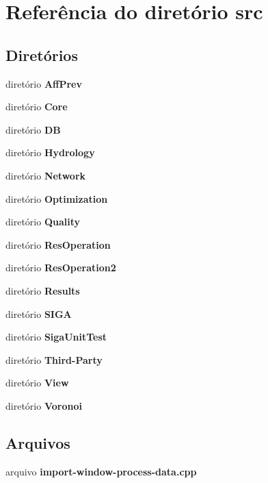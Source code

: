 \section{Referência do diretório src}
\label{dir_68267d1309a1af8e8297ef4c3efbcdba}
\subsection*{Diretórios}
\begin{DoxyCompactItemize}
\item 
diretório {\bf Aff\+Prev}
\item 
diretório {\bf Core}
\item 
diretório {\bf DB}
\item 
diretório {\bf Hydrology}
\item 
diretório {\bf Network}
\item 
diretório {\bf Optimization}
\item 
diretório {\bf Quality}
\item 
diretório {\bf Res\+Operation}
\item 
diretório {\bf Res\+Operation2}
\item 
diretório {\bf Results}
\item 
diretório {\bf S\+I\+GA}
\item 
diretório {\bf Siga\+Unit\+Test}
\item 
diretório {\bf Third-\/\+Party}
\item 
diretório {\bf View}
\item 
diretório {\bf Voronoi}
\end{DoxyCompactItemize}
\subsection*{Arquivos}
\begin{DoxyCompactItemize}
\item 
arquivo {\bf import-\/window-\/process-\/data.\+cpp}
\end{DoxyCompactItemize}
